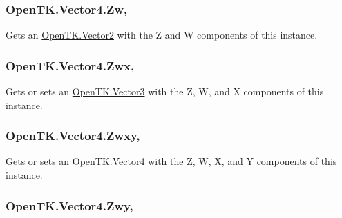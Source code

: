 \hypertarget{struct_open_t_k_1_1_vector4_ab22b4c879a39da1588e14ff867627b44}{
\subsubsection[{Zw}]{ Open\-T\-K.\-Vector4.\-Zw\hspace{0.3cm}{\ttfamily [get]}, {\ttfamily [set]}}}\label{struct_open_t_k_1_1_vector4_ab22b4c879a39da1588e14ff867627b44}


Gets an \hyperlink{struct_open_t_k_1_1_vector2}{Open\-T\-K.\-Vector2} with the Z and W components of this instance. 

\hypertarget{struct_open_t_k_1_1_vector4_afe3b5e6536855e02a9a287e5aa85b067}{
\subsubsection[{Zwx}]{ Open\-T\-K.\-Vector4.\-Zwx\hspace{0.3cm}{\ttfamily [get]}, {\ttfamily [set]}}}\label{struct_open_t_k_1_1_vector4_afe3b5e6536855e02a9a287e5aa85b067}


Gets or sets an \hyperlink{struct_open_t_k_1_1_vector3}{Open\-T\-K.\-Vector3} with the Z, W, and X components of this instance. 

\hypertarget{struct_open_t_k_1_1_vector4_a9b4ba0bbb30945a9cd03f22c37fe2704}{
\subsubsection[{Zwxy}]{ Open\-T\-K.\-Vector4.\-Zwxy\hspace{0.3cm}{\ttfamily [get]}, {\ttfamily [set]}}}\label{struct_open_t_k_1_1_vector4_a9b4ba0bbb30945a9cd03f22c37fe2704}


Gets or sets an \hyperlink{struct_open_t_k_1_1_vector4}{Open\-T\-K.\-Vector4} with the Z, W, X, and Y components of this instance. 

\hypertarget{struct_open_t_k_1_1_vector4_a12fd3a0b6ac4841b95ea39a34cc10493}{
\subsubsection[{Zwy}]{ Open\-T\-K.\-Vector4.\-Zwy\hspace{0.3cm}{\ttfamily [get]}, {\ttfamily [set]}}}\label{struct_open_t_k_1_1_vector4_a12fd3a0b6ac4841b95ea39a34cc10493}


